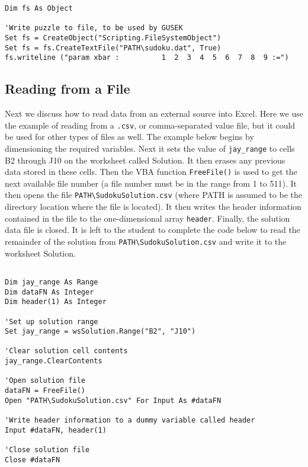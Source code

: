 \documentclass[10pt]{article}
\begin{document}
\begin{verbatim}
Dim fs As Object

'Write puzzle to file, to be used by GUSEK
Set fs = CreateObject("Scripting.FileSystemObject")
Set fs = fs.CreateTextFile("PATH\sudoku.dat", True)  
fs.writeline ("param xbar :          1  2  3  4  5  6  7  8  9 :=")

\end{verbatim}

\subsection{Reading from a File}
\label{sec:read}

Next we discuss how to read data from an external source into Excel.  Here we use the example of reading from a {\tt .csv}, or comma-separated value file, but it could be used for other types of files as well.  The example below begins by dimensioning the required variables.  Next it sets the value of {\tt jay\_range} to cells B2 through J10 on the worksheet called Solution.  It then erases any previous data stored in these cells.  Then the VBA function {\tt FreeFile()} is used to get the next available file number (a file number must be in the range from 1 to 511).  It then opens the file {\tt PATH\textbackslash SudokuSolution.csv} (where PATH is assumed to be the directory location where the file is located).  It then writes the header information contained in the file to the one-dimensional array {\tt header}.  Finally, the solution data file is closed.  It is left to the student to complete the code below to read the remainder of the solution from {\tt PATH\textbackslash SudokuSolution.csv} and write it to the worksheet Solution.

\begin{verbatim}

Dim jay_range As Range
Dim dataFN As Integer
Dim header(1) As Integer

'Set up solution range
Set jay_range = wsSolution.Range("B2", "J10")

'Clear solution cell contents
jay_range.ClearContents

'Open solution file
dataFN = FreeFile()
Open "PATH\SudokuSolution.csv" For Input As #dataFN

'Write header information to a dummy variable called header
Input #dataFN, header(1)

'Close solution file
Close #dataFN

\end{verbatim}
\end{document}
